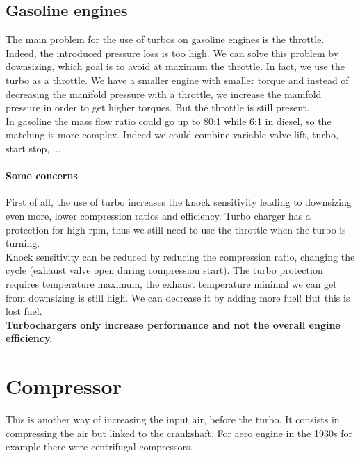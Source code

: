 \subsection{Gasoline engines}
	The main problem for the use of turbos on gasoline engines is the throttle. Indeed, the introduced pressure loss is too high. We can solve this problem by downsizing, which goal is to avoid at maximum the throttle. In fact, we use the turbo as a throttle. We have a smaller engine with smaller torque and instead of decreasing the manifold pressure with a throttle, we increase the manifold pressure in order to get higher torques. But the throttle is still present. \\
	
	In gasoline the mass flow ratio could go up to 80:1 while 6:1 in diesel, so the matching is more complex. Indeed we could combine variable valve lift, turbo, start stop, ...  
	
\paragraph{Some concerns}
	First of all, the use of turbo increases the knock sensitivity leading to downsizing even more, lower compression ratios and efficiency. Turbo charger has a protection for high rpm, thus we still need to use the throttle when the turbo is turning. \\
	
	Knock sensitivity can be reduced by reducing the compression ratio, changing the cycle (exhaust valve open during compression start). The turbo protection requires temperature maximum, the exhaust temperature minimal we can get from downsizing is still high. We can decrease it by adding more fuel! But this is lost fuel.  \\
	
	\textbf{Turbochargers only increase performance and not the overall engine efficiency.}
	
\section{Compressor}
	This is another way of increasing the input air, before the turbo. It consists in compressing the air but linked to the crankshaft. For aero engine in the 1930s for example there were centrifugal compressors. 
	
	\ \\\\
	
